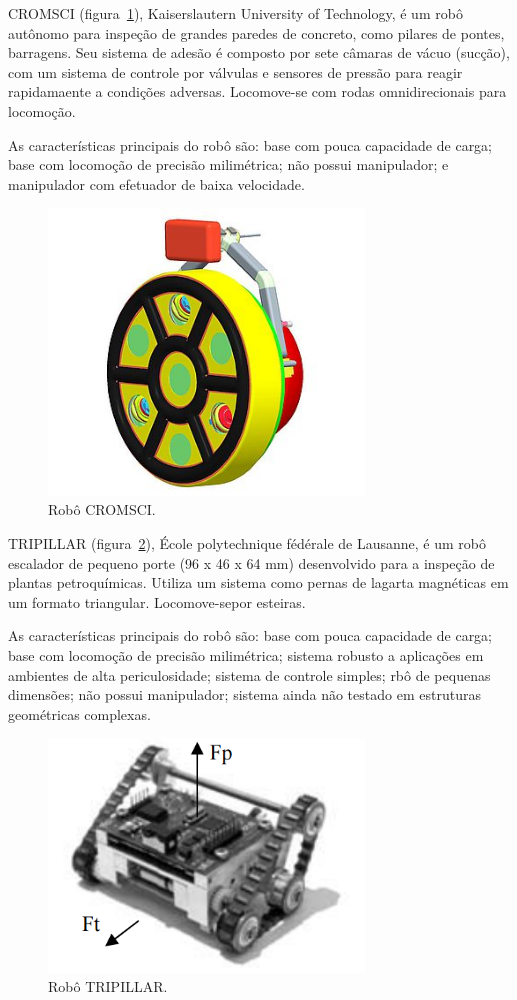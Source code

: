 CROMSCI (figura~\ref{cromsci}), Kaiserslautern University of Technology, é um
robô autônomo para inspeção de grandes paredes de concreto, como pilares de pontes, barragens. Seu
sistema de adesão é composto por sete câmaras de vácuo (sucção), com um sistema
de controle por válvulas e sensores de pressão para reagir rapidamaente a
condições adversas. Locomove-se com rodas omnidirecionais para locomoção.

As características principais do robô são: base com pouca capacidade de
carga; base com locomoção de precisão milimétrica; não possui manipulador; e
manipulador com efetuador de baixa velocidade.

\begin{figure}[ht]
\centering
\includegraphics[width=8.4cm]{figs/climbers/cromsci.jpg}
\caption{Robô CROMSCI.}
\label{cromsci}
\end{figure}

TRIPILLAR (figura~\ref{tripillar}), École polytechnique fédérale de Lausanne, é
um robô escalador de pequeno porte (96 x 46 x 64 mm) desenvolvido para a inspeção de plantas
petroquímicas. Utiliza um sistema como pernas de lagarta magnéticas em um
formato triangular. Locomove-sepor esteiras.

As características principais do robô são: base com pouca capacidade de
carga; base com locomoção de precisão milimétrica; sistema robusto a aplicações
em ambientes de alta periculosidade; sistema de controle simples; rbô de
pequenas dimensões; não possui manipulador; sistema ainda não testado em estruturas geométricas complexas.


\begin{figure}[ht]
\centering
\includegraphics[width=8.4cm]{figs/climbers/tripillar.png}
\caption{Robô TRIPILLAR.}
\label{tripillar}
\end{figure}
   
